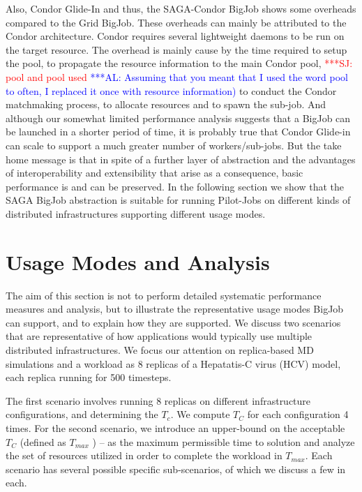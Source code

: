 \documentclass[conference,final]{IEEEtran}
\newcommand{\up}{\vspace*{-1em}}
\newcommand{\numrep}{8 }
\newcommand{\samplenum}{4 }
\newcommand{\tmax}{$T_{max}$ }
\newcommand{\tc}{$T_{C}$ }
\newcommand{\alnote}[1]{ {\textcolor{blue} { ***AL: #1 }}}
\newcommand{\jhanote}[1]{ {\textcolor{red} { ***SJ: #1 }}}
\newcommand{\alnote}[1]{}
\newcommand{\jhanote}[1]{}
\begin{document}
Also, Condor Glide-In and thus, the SAGA-Condor BigJob shows some
overheads compared to the Grid BigJob. These overheads can mainly be
attributed to the Condor architecture. Condor requires several
lightweight daemons to be run on the target resource. The overhead is
mainly cause by the time required to setup the pool, to propagate the
resource information to the main Condor pool, \jhanote{pool and pool used} 
\alnote{Assuming that you meant that I used the word pool to often, I replaced it once with resource information)}
to conduct the Condor matchmaking process,
to allocate resources and to spawn the sub-job. And although our
somewhat limited performance analysis suggests that a BigJob can be
launched in a shorter period of time, it is probably true that Condor
Glide-in can scale to support a much greater number of
workers/sub-jobs. But the take home message is that in spite of a
further layer of abstraction and the advantages of interoperability
and extensibility that arise as a consequence, basic performance is
and can be preserved.  In the following section we show that the SAGA
BigJob abstraction is suitable for running Pilot-Jobs on different
kinds of distributed infrastructures supporting different usage modes.


\up
\section{Usage Modes and Analysis}
\up

The aim of this section is not to perform detailed systematic
performance measures and analysis, but to illustrate the
representative usage modes BigJob can support, and to explain how they
are supported.  We discuss two scenarios that are representative of
how applications would typically use multiple distributed
infrastructures. We focus our attention on replica-based MD
simulations and a workload as \numrep replicas of a Hepatatis-C virus
(HCV) model, each replica running for 500 timesteps.  

The first scenario involves running \numrep replicas on different
infrastructure configurations, and determining the $T_c$. We compute
\tc for each configuration \samplenum times.  For the second scenario,
we introduce an upper-bound on the acceptable \tc (defined as \tmax)
-- as the maximum permissible time to solution and analyze the set of
resources utilized in order to complete the workload in
$T_{max}$. Each scenario has several possible specific sub-scenarios,
of which we discuss a few in each.  
\end{document}
